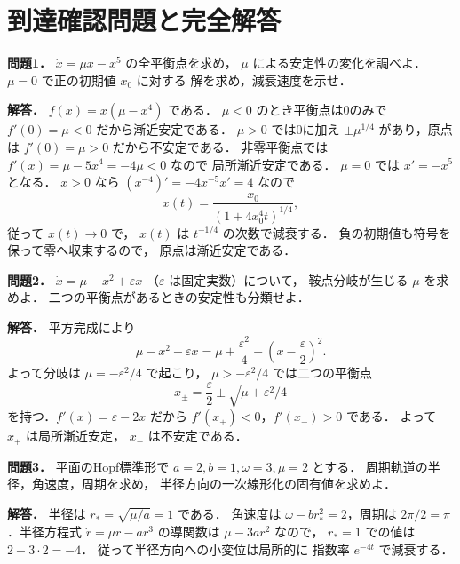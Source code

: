 \documentclass[a5paper,10pt,onecolumn]{jsarticle}
\theoremstyle{mathnotetheorem}
\begin{document}
\section*{到達確認問題と完全解答}
\noindent\textbf{問題1．}
$\dot x=\mu x-x^5$ の全平衡点を求め，
$\mu$ による安定性の変化を調べよ．
$\mu=0$ で正の初期値 $x_0$ に対する
解を求め，減衰速度を示せ．

\medskip\noindent\textbf{解答．}
$f(x)=x(\mu-x^4)$ である．
$\mu<0$ のとき平衡点は0のみで
$f'(0)=\mu<0$ だから漸近安定である．
$\mu>0$ では0に加え
$\pm\mu^{1/4}$ があり，原点は
$f'(0)=\mu>0$ だから不安定である．
非零平衡点では
$f'(x)=\mu-5x^4=-4\mu<0$ なので
局所漸近安定である．
$\mu=0$ では $x'=-x^5$ となる．
$x>0$ なら
$(x^{-4})'=-4x^{-5}x'=4$ なので
\[
 x(t)=\frac{x_0}{(1+4x_0^4t)^{1/4}},
\]
従って $x(t)\to0$ で，
$x(t)$ は $t^{-1/4}$ の次数で減衰する．
負の初期値も符号を保って零へ収束するので，
原点は漸近安定である．

\medskip\noindent\textbf{問題2．}
$\dot x=\mu-x^2+\varepsilon x$
（$\varepsilon$ は固定実数）について，
鞍点分岐が生じる $\mu$ を求めよ．
二つの平衡点があるときの安定性も分類せよ．

\medskip\noindent\textbf{解答．}
平方完成により
\[
 \mu-x^2+\varepsilon x
 =\mu+\frac{\varepsilon^2}{4}
   -\left(x-\frac{\varepsilon}{2}\right)^2.
\]
よって分岐は $\mu=-\varepsilon^2/4$ で起こり，
$\mu>-\varepsilon^2/4$ では二つの平衡点
\[
 x_\pm=\frac{\varepsilon}{2}
       \pm\sqrt{\mu+\varepsilon^2/4}
\]
を持つ．$f'(x)=\varepsilon-2x$ だから
$f'(x_+)<0$，$f'(x_-)>0$ である．
よって $x_+$ は局所漸近安定，
$x_-$ は不安定である．

\medskip\noindent\textbf{問題3．}
平面のHopf標準形で
$a=2,b=1,\omega=3,\mu=2$ とする．
周期軌道の半径，角速度，周期を求め，
半径方向の一次線形化の固有値を求めよ．

\medskip\noindent\textbf{解答．}
半径は $r_*=\sqrt{\mu/a}=1$ である．
角速度は $\omega-br_*^2=2$，周期は
$2\pi/2=\pi$．半径方程式
$\dot r=\mu r-ar^3$ の導関数は
$\mu-3ar^2$ なので，
$r_*=1$ での値は $2-3\cdot2=-4$．
従って半径方向への小変位は局所的に
指数率 $e^{-4t}$ で減衰する．
\end{document}

